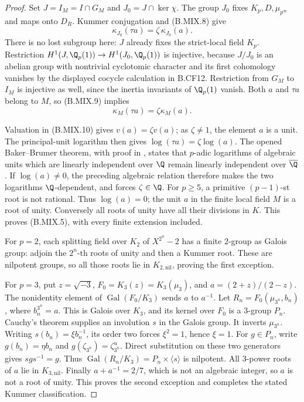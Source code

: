 \begin{proof}
Set \(J=I_M=I\cap G_M\) and \(J_0=J\cap\ker\chi\).
The group \(J_0\) fixes \(K_p,D,\mu_{p^\infty}\) and
maps onto \(D_R\). Kummer conjugation and (B.MIX.8) give
\[
       \kappa_{J_0}(\tau a)=\zeta\,\kappa_{J_0}(a).
                                                        \tag{B.MIX.9}
\]
There is no lost subgroup here: \(J\) already fixes the
strict-local field \(K_p\). Restriction
\(H^1(J,\Q_p(1))\to H^1(J_0,\Q_p(1))\) is injective,
because \(J/J_0\) is an abelian group with nontrivial
cyclotomic character and its first cohomology vanishes by
the displayed cocycle calculation in B.CF12. Restriction
from \(G_M\) to \(I_M\) is injective as well, since the
inertia invariants of \(\Q_p(1)\) vanish. Both \(a\) and
\(\tau a\) belong to \(M\), so (B.MIX.9) implies
\[
                \kappa_M(\tau a)=\zeta\kappa_M(a).
                                                        \tag{B.MIX.10}
\]

Valuation in (B.MIX.10) gives \(v(a)=\zeta v(a)\);
as \(\zeta\ne1\), the element \(a\) is a unit.
The principal-unit logarithm then gives
\(\log(\tau a)=\zeta\log(a)\).
The opened Baker--Brumer theorem, with proof in
\citep[Théorème, pp.~1--2]{Rousseau1969}, states that
\(p\)-adic logarithms of algebraic units which are linearly
independent over \(\Q\) remain linearly independent over
\(\overline\Q\). If \(\log(a)\ne0\), the preceding
algebraic relation therefore makes the two logarithms
\(\Q\)-dependent, and forces \(\zeta\in\Q\).
For \(p\geq5\), a primitive \((p-1)\)-st root is not
rational. Thus \(\log(a)=0\); the unit \(a\) in the
finite local field \(M\) is a root of unity. Conversely
all roots of unity have all their divisions in \(K\).
This proves (B.MIX.5), with every finite extension included.

For \(p=2\), each splitting field over \(K_2\) of
\(X^{2^n}-2\) has a finite \(2\)-group as Galois group:
adjoin the \(2^n\)-th roots of unity and then a Kummer
root. These are nilpotent groups, so all those roots lie
in \(K_{2,\mathrm{nil}}\), proving the first exception.

For \(p=3\), put \(z=\sqrt{-3}\),
\(F_0=K_3(z)=K_3(\mu_3)\), and
\(a=(2+z)/(2-z)\). The nonidentity element of
\(\operatorname{Gal}(F_0/K_3)\) sends \(a\) to \(a^{-1}\).
Let \(R_n=F_0(\mu_{3^n},b_n)\), where \(b_n^{3^n}=a\).
This is Galois over \(K_3\), and its kernel over \(F_0\)
is a \(3\)-group \(P_n\). Cauchy's theorem supplies an
involution \(s\) in the Galois group. It inverts
\(\mu_{3^n}\). Writing \(s(b_n)=\xi b_n^{-1}\), its
order two forces \(\xi^2=1\), hence \(\xi=1\).
For \(g\in P_n\), write
\(g(b_n)=\eta b_n\) and \(g(\zeta_{3^n})=\zeta_{3^n}^{u}\).
Direct substitution on these two generators gives
\(sgs^{-1}=g\). Thus
\(\operatorname{Gal}(R_n/K_3)=P_n\times\langle s\rangle\)
is nilpotent. All \(3\)-power roots of \(a\) lie in
\(K_{3,\mathrm{nil}}\). Finally
\(a+a^{-1}=2/7\), which is not an algebraic integer,
so \(a\) is not a root of unity. This proves the second
exception and completes the stated Kummer classification.
\end{proof}

